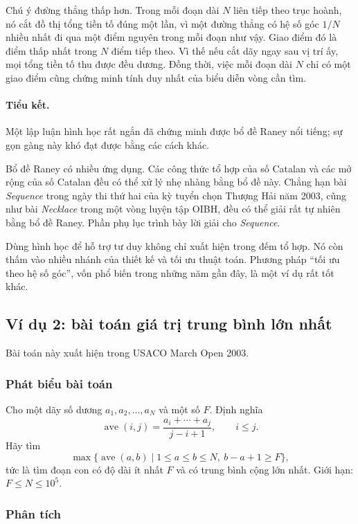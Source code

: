 \documentclass[11pt]{article}
\begin{document}
Chú ý đường thẳng thấp hơn. Trong mỗi đoạn dài $N$ liên tiếp theo trục hoành,
nó cắt đồ thị tổng tiền tố đúng một lần, vì một đường thẳng có hệ số góc
$1/N$ nhiều nhất đi qua một điểm nguyên trong mỗi đoạn như vậy. Giao điểm đó
là điểm thấp nhất trong $N$ điểm tiếp theo. Vì thế nếu cắt dãy ngay sau vị
trí ấy, mọi tổng tiền tố thu được đều dương. Đồng thời, việc mỗi đoạn dài
$N$ chỉ có một giao điểm cũng chứng minh tính duy nhất của biểu diễn vòng cần
tìm.

\paragraph{Tiểu kết.}
Một lập luận hình học rất ngắn đã chứng minh được bổ đề Raney nổi tiếng; sự
gọn gàng này khó đạt được bằng các cách khác.

Bổ đề Raney có nhiều ứng dụng. Các công thức tổ hợp của số Catalan và các mở
rộng của số Catalan đều có thể xử lý nhẹ nhàng bằng bổ đề này. Chẳng hạn bài
\textit{Sequence} trong ngày thi thứ hai của kỳ tuyển chọn Thượng Hải năm
2003, cũng như bài \textit{Necklace} trong một vòng luyện tập OIBH, đều có
thể giải rất tự nhiên bằng bổ đề Raney. Phần phụ lục trình bày lời giải cho
\textit{Sequence}.

Dùng hình học để hỗ trợ tư duy không chỉ xuất hiện trong đếm tổ hợp. Nó còn
thấm vào nhiều nhánh của thiết kế và tối ưu thuật toán. Phương pháp ``tối ưu
theo hệ số góc'', vốn phổ biến trong những năm gần đây, là một ví dụ rất tốt
khác.

\subsection{Ví dụ 2: bài toán giá trị trung bình lớn nhất}

Bài toán này xuất hiện trong USACO March Open 2003.

\subsubsection*{Phát biểu bài toán}

Cho một dãy số dương $a_1,a_2,\ldots,a_N$ và một số $F$. Định nghĩa
\[
  \operatorname{ave}(i,j)=
  \frac{a_i+\cdots+a_j}{j-i+1},\qquad i\le j.
\]
Hãy tìm
\[
  \max\{\operatorname{ave}(a,b)\mid 1\le a\le b\le N,\ b-a+1\ge F\},
\]
tức là tìm đoạn con có độ dài ít nhất $F$ và có trung bình cộng lớn nhất.
Giới hạn: $F\le N\le 10^5$.

\subsubsection*{Phân tích}
\end{document}
